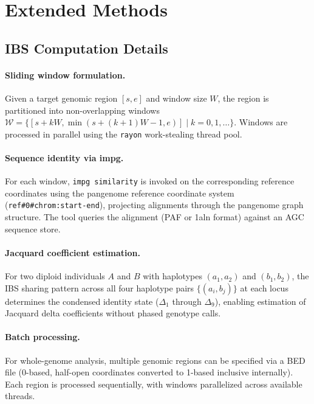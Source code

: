 \documentclass[11pt]{article}
\begin{document}
\section{Extended Methods}
\label{sec:supp_methods}

\subsection{IBS Computation Details}
\label{sec:supp_ibs_details}

\paragraph{Sliding window formulation.}
Given a target genomic region $[s, e]$ and window size $W$, the region is partitioned into non-overlapping windows $\mathcal{W} = \{[s + kW, \min(s + (k+1)W - 1, e)] \mid k = 0, 1, \ldots\}$. Windows are processed in parallel using the \texttt{rayon} work-stealing thread pool.

\paragraph{Sequence identity via impg.}
For each window, \texttt{impg similarity} is invoked on the corresponding reference coordinates using the pangenome reference coordinate system (\texttt{ref\#0\#chrom:start-end}), projecting alignments through the pangenome graph structure. The tool queries the alignment (PAF or 1aln format) against an AGC sequence store.

\paragraph{Jacquard coefficient estimation.}
For two diploid individuals $A$ and $B$ with haplotypes $(a_1, a_2)$ and $(b_1, b_2)$, the IBS sharing pattern across all four haplotype pairs $\{(a_i, b_j)\}$ at each locus determines the condensed identity state ($\Delta_1$ through $\Delta_9$), enabling estimation of Jacquard delta coefficients without phased genotype calls.

\paragraph{Batch processing.}
For whole-genome analysis, multiple genomic regions can be specified via a BED file (0-based, half-open coordinates converted to 1-based inclusive internally). Each region is processed sequentially, with windows parallelized across available threads.
\end{document}
